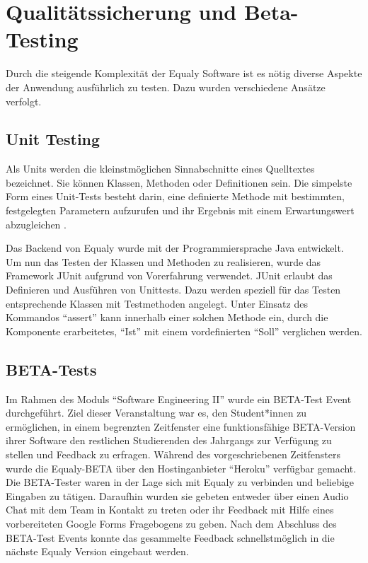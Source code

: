 \section{Qualitätssicherung und Beta-Testing}
\label{sec:qualitätssicherung}

Durch die steigende Komplexität der Equaly Software ist es nötig diverse Aspekte der Anwendung ausführlich zu testen. Dazu wurden verschiedene Ansätze verfolgt.


\subsection{Unit Testing}


Als Units werden die kleinstmöglichen Sinnabschnitte eines Quelltextes bezeichnet. Sie können Klassen, Methoden oder Definitionen sein. Die simpelste Form eines Unit-Tests besteht darin, eine definierte Methode mit bestimmten, festgelegten Parametern aufzurufen und ihr Ergebnis mit einem Erwartungswert abzugleichen \cite{Hub16}.

Das Backend von Equaly wurde mit der Programmiersprache Java entwickelt. Um nun das Testen der Klassen und Methoden zu realisieren, wurde das Framework JUnit aufgrund von Vorerfahrung verwendet. JUnit erlaubt das Definieren und Ausführen von Unittests. Dazu werden speziell für das Testen entsprechende Klassen mit Testmethoden angelegt. Unter Einsatz des Kommandos ``assert'' kann innerhalb einer solchen Methode ein, durch die Komponente erarbeitetes, ``Ist'' mit einem vordefinierten ``Soll'' verglichen werden.


\subsection{BETA-Tests}

Im Rahmen des Moduls ``Software Engineering II'' wurde ein BETA-Test Event durchgeführt. Ziel dieser Veranstaltung war es, den Student*innen zu ermöglichen, in einem begrenzten Zeitfenster eine funktionsfähige BETA-Version ihrer Software den restlichen Studierenden des Jahrgangs zur Verfügung zu stellen und Feedback zu erfragen. Während des vorgeschriebenen Zeitfensters wurde die Equaly-BETA über den Hostinganbieter ``Heroku'' verfügbar gemacht. Die BETA-Tester waren in der Lage sich mit Equaly zu verbinden und beliebige Eingaben zu tätigen. Daraufhin wurden sie gebeten entweder über einen Audio Chat mit dem Team in Kontakt zu treten oder ihr Feedback mit Hilfe eines vorbereiteten Google Forms Fragebogens zu geben. Nach dem Abschluss des BETA-Test Events konnte das gesammelte Feedback schnellstmöglich in die nächste Equaly Version eingebaut werden.

